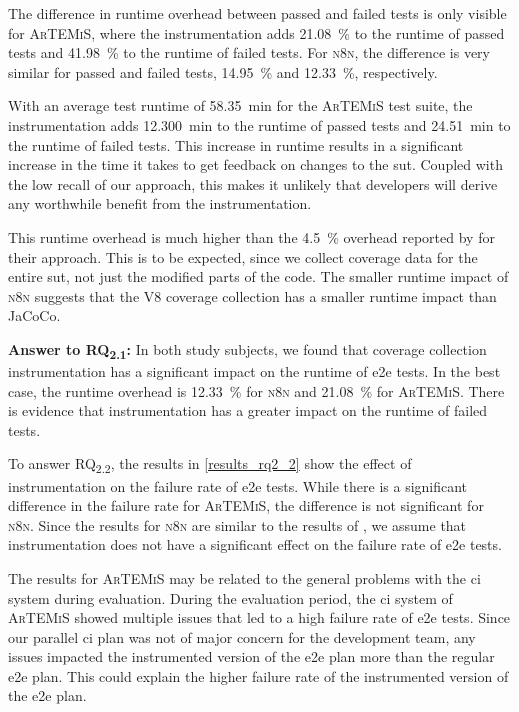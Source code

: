 The difference in runtime overhead between passed and failed tests is only visible for \textsc{ArTEMiS}, where the instrumentation adds \SI{21.08}{\percent} to the runtime of passed tests and \SI{41.98}{\percent} to the runtime of failed tests.
For \textsc{n8n}, the difference is very similar for passed and failed tests, \SI{14.95}{\percent} and \SI{12.33}{\percent}, respectively.

With an average test runtime of \SI{58.35}{\minute} for the \textsc{ArTEMiS} test suite, the instrumentation adds \SI{12.300}{\minute} to the runtime of passed tests and \SI{24.51}{\minute} to the runtime of failed tests.
This increase in runtime results in a significant increase in the time it takes to get feedback on changes to the \ac{sut}.
Coupled with the low recall of our approach, this makes it unlikely that developers will derive any worthwhile benefit from the instrumentation.

This runtime overhead is much higher than the \SI{4.5}{\percent} overhead reported by \citeauthor*{bell_deflaker_2018} for their approach.
This is to be expected, since we collect coverage data for the entire \ac{sut}, not just the modified parts of the code.
The smaller runtime impact of \textsc{n8n} suggests that the V8 coverage collection has a smaller runtime impact than JaCoCo.

\begin{mdframed}
	\textbf{Answer to RQ\textsubscript{2.1}:} In both study subjects, we found that coverage collection instrumentation has a significant impact on the runtime of \ac{e2e} tests.
	In the best case, the runtime overhead is \SI{12.33}{\percent} for \textsc{n8n} and \SI{21.08}{\percent} for \textsc{ArTEMiS}.
	There is evidence that instrumentation has a greater impact on the runtime of failed tests.
\end{mdframed}

To answer RQ\textsubscript{2.2}, the results in \cref{results_rq2_2} show the effect of instrumentation on the failure rate of \ac{e2e} tests.
While there is a significant difference in the failure rate for \textsc{ArTEMiS}, the difference is not significant for \textsc{n8n}.
Since the results for \textsc{n8n} are similar to the results of \citeauthor*{rasheed_effect_2023} \autocite{rasheed_effect_2023}, we assume that instrumentation does not have a significant effect on the failure rate of \ac{e2e} tests.

The results for \textsc{ArTEMiS} may be related to the general problems with the \ac{ci} system during evaluation.
During the evaluation period, the \ac{ci} system of \textsc{ArTEMiS} showed multiple issues that led to a high failure rate of \ac{e2e} tests.
Since our parallel \ac{ci} plan was not of major concern for the development team, any issues impacted the instrumented version of the \ac{e2e} plan more than the regular \ac{e2e} plan.
This could explain the higher failure rate of the instrumented version of the \ac{e2e} plan.

